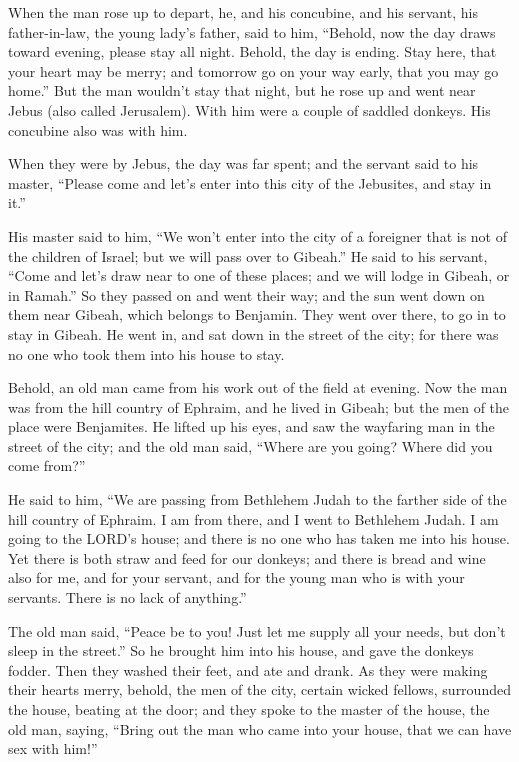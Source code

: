 \myverse{}When the man rose up to depart, he, and his concubine, and his
servant, his father-in-law, the young lady’s father, said to him, “Behold, now the day draws toward evening,
please stay all night. Behold, the day is ending. Stay here, that your heart may be merry; and tomorrow
go on your way early, that you may go home.”
\myverse{}But the man wouldn’t stay that night, but he rose up and went near Jebus
(also called Jerusalem). With him were a couple of saddled donkeys. His concubine also was with him.

\myverse{}When they were by Jebus, the day was far spent; and the servant
said to his master, “Please come and let’s enter into this city of the Jebusites, and stay in it.”

\myverse{}His master said to him, “We won’t enter into the city of a foreigner
that is not of the children of Israel; but we will pass over to Gibeah.”
\myverse{}He said to his servant, “Come and let’s draw near to one of these places;
and we will lodge in Gibeah, or in Ramah.”
\myverse{}So they passed on and went their way; and the sun went down on them near
Gibeah, which belongs to Benjamin.
\myverse{}They went over there, to go in to stay in Gibeah. He went in, and sat down
in the street of the city; for there was no one who took them into his house to stay.

\myverse{}Behold, an old man came from his work out of the field at evening.
Now the man was from the hill country of Ephraim, and he lived in Gibeah; but the men of the place were
Benjamites.
\myverse{}He lifted up his eyes, and saw the wayfaring man in the street of the city;
and the old man said, “Where are you going? Where did you come from?”

\myverse{}He said to him, “We are passing from Bethlehem Judah to the
farther side of the hill country of Ephraim. I am from there, and I went to Bethlehem Judah. I am going
to the LORD’s house; and there is no one who has taken me into his house.
\myverse{}Yet there is both straw and feed for our donkeys; and there is bread and
wine also for me, and for your servant, and for the young man who is with your servants. There is no lack
of anything.”

\myverse{}The old man said, “Peace be to you! Just let me supply all your
needs, but don’t sleep in the street.”
\myverse{}So he brought him into his house, and gave the donkeys fodder. Then they
washed their feet, and ate and drank.
\myverse{}As they were making their hearts merry, behold, the men of the city, certain
wicked fellows, surrounded the house, beating at the door; and they spoke to the master of the house,
the old man, saying, “Bring out the man who came into your house, that we can have sex with him!”

